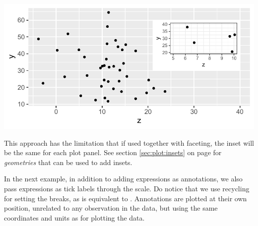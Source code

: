 \documentclass[krantz2]{krantz}\usepackage{knitr}
\begin{document}
\begin{knitrout}\footnotesize
{}\color{fgcolor}\begin{kframe}
\begin{alltt}
 \hlkwb{<-}   \hlopt{+}
  \hlstd{()}
 \hlopt{+} \hlstd{(} \hlstd{=} \hlstd{)} \hlopt{+}
  \hlstd{(} \hlopt{+} \hlstd{(} \hlstd{=} \hlstd{(}\hlstd{,} \hlstd{),}  \hlstd{=} \hlstd{(}\hlstd{,} \hlstd{))} \hlopt{+}
                               \hlstd{(}\hlstd{)),}
                     \hlstd{=} \hlstd{,}  \hlstd{=} \hlstd{,}  \hlstd{=} \hlstd{,}  \hlstd{=} \hlstd{)}
\end{alltt}
\end{kframe}

{\centering \includegraphics[width=.7\textwidth]{figure/pos-inset-01-1} 

}


\end{knitrout}

This approach has the limitation that if used together with faceting, the inset will be the same for each plot panel. See section \ref{sec:plot:insets} on page \pageref{sec:plot:insets} for \emph{geometries} that can be used to add insets.

In the next example, in addition to adding expressions as annotations, we also pass expressions as tick labels through the scale. Do notice that we use recycling for setting the breaks, as  is equivalent to . Annotations are plotted at their own position, unrelated to any observation in the data, but using the same coordinates and units as for plotting the data.
\end{document}
